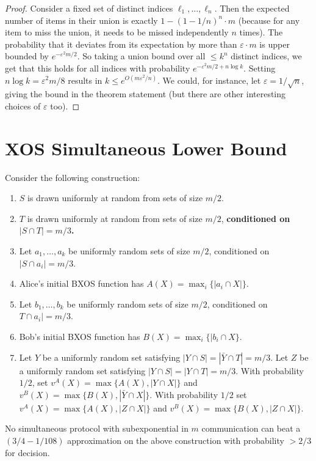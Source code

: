 \begin{proof}
Consider a fixed set of distinct indices $\ell_1,\ldots, \ell_n$. Then the expected number of items in their union is exactly $1-(1-1/n)^n \cdot m$ (because for any item to miss the union, it needs to be missed independently $n$ times). The probability that it deviates from its expectation by more than $\varepsilon \cdot m$ is upper bounded by $e^{-\varepsilon^2 m/2}$. So taking a union bound over all $\leq k^n$ distinct indices, we get that this holds for all indices with probability $e^{-\varepsilon^2 m/2 + n\log k}$. Setting $n \log k = \varepsilon^2 m/8$ results in $k \leq e^{O(m\varepsilon^2/n)}$. We could, for instance, let $\varepsilon = 1/\sqrt{n}$, giving the bound in the theorem statement (but there are other interesting choices of $\varepsilon$ too). 
\end{proof}

\section{XOS Simultaneous Lower Bound}
Consider the following construction:

\begin{enumerate}
\item $S$ is drawn uniformly at random from sets of size $m/2$.
\item $T$ is drawn uniformly at random from sets of size $m/2$, \textbf{conditioned on $|S \cap T| = m/3$.}
\item Let $a_1,\ldots, a_k$ be uniformly random sets of size $m/2$, conditioned on $|S \cap a_i| = m/3$.
\item Alice's initial BXOS function has $A(X) = \max_i \{|a_i \cap X|\}$. 
\item Let $b_1,\ldots, b_k$ be uniformly random sets of size $m/2$, conditioned on $T \cap a_i| = m/3$. 
\item Bob's initial BXOS function has $B(X) = \max_i \{|b_i \cap X\}$. 
\item Let $Y$ be a uniformly random set satisfying $|Y \cap S| = |\bar{Y} \cap T| = m/3$. Let $Z$ be a uniformly random set satisfying $|Y \cap S| = |Y \cap T| = m/3$. With probability $1/2$, set $v^A(X) = \max\{A(X),|Y \cap X|\}$ and $v^B(X) = \max\{B(X), |\bar{Y} \cap X|\}$. With probability $1/2$ set $v^A(X) = \max\{A(X), |Z \cap X|\}$ and $v^B(X) = \max\{B(X), |Z\cap X|\}$. 
\end{enumerate}

\begin{theorem} No simultaneous protocol with subexponential in $m$ communication can beat a $(3/4-1/108)$ approximation on the above construction with probability $> 2/3$ for decision.

\end{theorem}

